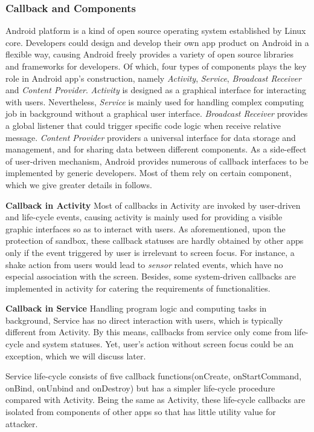 \documentclass{sig-alternate-05-2015}
\begin{document}
\subsubsection{Callback and Components}
Android platform is a kind of open source operating system established by Linux core. Developers could design and develop their own app product on Android in a flexible way, causing Android freely provides a variety of open source libraries and frameworks for developers. Of which, four types of components plays the key role in Android app's construction, namely \textit{Activity}, \textit{Service}, \textit{Broadcast Receiver} and \textit{Content Provider}. \textit{Activity} is designed as a graphical interface for interacting with users. Nevertheless, \textit{Service} is mainly used for handling complex computing job in background without a graphical user interface. \textit{Broadcast Receiver} provides a global listener that could trigger specific code logic when receive relative message. \textit{Content Provider} providers a universal interface for data storage and management, and for sharing data between different components. As a side-effect of user-driven mechanism, Android provides numerous of callback interfaces to be implemented by generic developers. Most of them rely on certain component, which we give greater details in follows.

\textbf{Callback in Activity} 
Most of callbacks in Activity are invoked by user-driven and life-cycle events, causing activity is mainly used for providing a visible graphic interfaces so as to interact with users. As aforementioned, upon the protection of sandbox, these callback statuses are hardly obtained by other apps only if the event triggered by user is irrelevant to screen focus. For instance, a shake action from users would lead to \textit{sensor} related events, which have no especial association with the screen. Besides, some system-driven callbacks are implemented in activity for catering the requirements of functionalities. 

\textbf{Callback in Service} 
Handling program logic and computing tasks in background, Service has no direct interaction with users, which is typically different from Activity. By this means, callbacks from service only come from life-cycle and system statuses. Yet, user's action without screen focus could be an exception, which we will discuss later.

Service life-cycle consists of five callback functions(onCreate, onStartCommand, onBind, onUnbind and onDestroy) but has a simpler life-cycle procedure compared with Activity. Being the same as Activity, these life-cycle callbacks are isolated from components of other apps so that has little utility value for attacker. 
\end{document}
